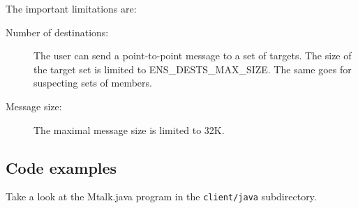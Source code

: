 The important limitations are: 
\begin{description}
\item[Number of destinations:] The user can send a point-to-point
  message to a set of targets. The size of the target set is limited
  to ENS\_DESTS\_MAX\_SIZE. The same goes for suspecting sets of
  members. 
\item[Message size:] The maximal message size is limited to 32K. 
\end{description}

\subsection{Code examples}
Take a look at the Mtalk.java program in the {\tt client/java} subdirectory.
